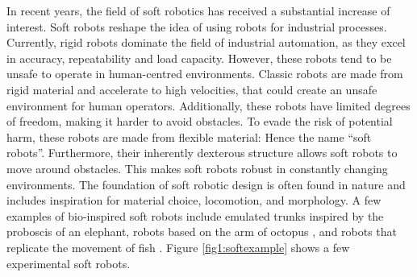 \label{chapter1}

In recent years, the field of soft robotics has received a substantial increase of interest. Soft robots reshape the idea of using robots for industrial processes. Currently, rigid robots dominate the field of industrial automation, as they excel in accuracy, repeatability and load capacity. However, these robots tend to be unsafe to operate in human-centred environments. Classic robots are made from rigid material and accelerate to high velocities, that could create an unsafe environment for human operators. Additionally, these robots have limited degrees of freedom, making it harder to avoid obstacles. To evade the risk of potential harm, these robots are made from flexible material: Hence the name ``soft robots''. Furthermore, their inherently dexterous structure allows soft robots to move around obstacles. This makes soft robots robust in constantly changing environments. The foundation of soft robotic design is often found in nature and includes inspiration for material choice, locomotion, and morphology. A few examples of bio-inspired soft robots include emulated trunks \cite{hannan2003kinematics} inspired by the proboscis of an elephant, robots based on the arm of octopus \cite{wang2013visual}, and robots that replicate the movement of fish \cite{marchese2014}. Figure \ref{fig1:softexample} shows a few experimental soft robots. 


